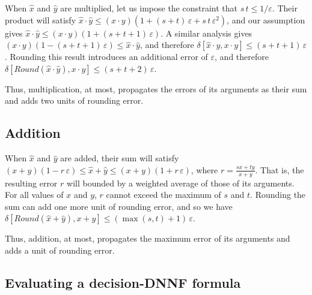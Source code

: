 \documentclass[letterpaper,USenglish,cleveref, autoref, thm-restate]{lipics-v2021}
\newcommand{\approximate}[1]{\hat{#1}}
\newcommand{\approxx}{\approximate{x}}
\newcommand{\approxy}{\approximate{y}}
\newcommand{\round}{\mathit{Round}}
\newcommand{\aerror}{\delta}
\newcommand{\roundepsilon}{\varepsilon}
\begin{document}
When $\approxx$ and $\approxy$ are multiplied, let us impose the constraint that $s\,t \leq 1/\roundepsilon$.
Their product will satisfy
$\approxx \cdot \approxy \leq (x\cdot y) (1 + (s+t)\,\roundepsilon + s\,t\,\roundepsilon^2)$, and our assumption gives
$\approxx \cdot \approxy \leq (x\cdot y) (1 + (s+t+1)\,\roundepsilon)$.
A similar analysis gives
$(x\cdot y) (1 - (s+t+1)\,\roundepsilon) \leq \approxx \cdot \approxy$, and therefore
$\aerror[\approxx \cdot \approxy, x \cdot y] \leq (s+t+1)\,\roundepsilon$.
Rounding this result introduces an additional error of $\roundepsilon$, and therefore
$\aerror[\round(\approxx \cdot \approxy), x \cdot y] \leq (s+t+2)\,\roundepsilon$.

Thus, multiplication, at most, propagates the errors of its arguments as their sum and adds two units of rounding error.

\subsection{Addition}

When $\approxx$ and $\approxy$ are added, their sum will satisfy
$(x + y) (1 - r\,\roundepsilon) \leq \approxx + \approxy \leq (x + y) (1 + r\,\roundepsilon)$, where $r = \frac{sx + ty}{x+y}$.  That is, the resulting error $r$ will bounded by a weighted average
of those of its arguments.  For all values of $x$ and $y$, $r$ cannot exceed the maximum of $s$ and $t$.
Rounding the sum can add one more unit of rounding error, and so we have
$\aerror[\round(\approxx + \approxy), x + y] \leq (\max(s,t)+1)\,\roundepsilon$.

Thus, addition, at most,  propagates the maximum error of its arguments and adds a unit of rounding error.

\subsection{Evaluating a decision-DNNF formula}
\label{sect:error:formula}
\end{document}
